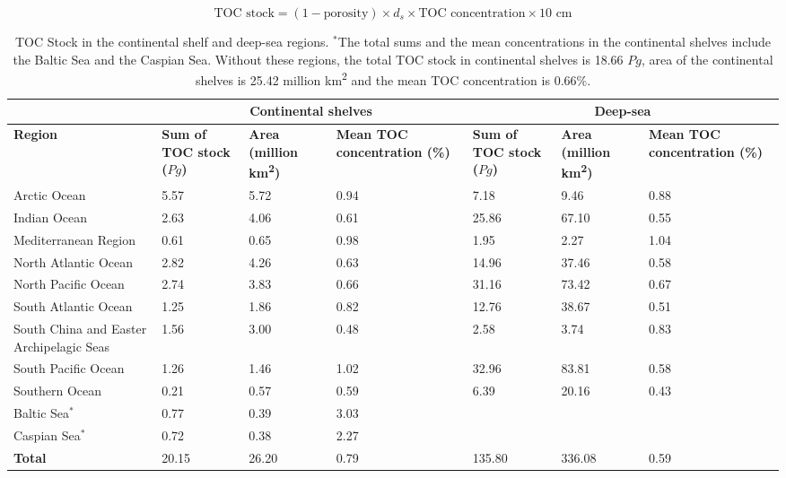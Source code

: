 \documentclass[journal abbreviation, manuscript]{copernicus}
\begin{document}
\begin{equation}
 \text{TOC stock} = (1 - \text{porosity}) \times d_s \times \text{TOC concentration} \times \text{10 cm}   
 \label{eq:stock}
\end{equation}


\begin{table}[htbp]

\centering
\begin{tabular}{|p{}|p{}|p{}|p{}||p{}|p{}|p{}|}
\hline
& \multicolumn{3}{c||}{\textbf{Continental shelves}} & \multicolumn{3}{c|}{\textbf{Deep-sea}} \\
\hline
\textbf{Region} & \textbf{Sum of TOC stock ($Pg$)} & \textbf{Area (million km\textsuperscript{2})} & \textbf{Mean TOC concentration (\%)} & \textbf{Sum of TOC stock ($Pg$)} & \textbf{Area (million km\textsuperscript{2})} & \textbf{Mean TOC concentration (\%)} \\
\hline
\hline
Arctic Ocean & 5.57& 5.72 & 0.94& 7.18& 9.46 & 0.88\\
\hline
Indian Ocean & 2.63& 4.06 & 0.61& 25.86& 67.10 & 0.55\\
\hline
Mediterranean Region & 0.61& 0.65 & 0.98& 1.95& 2.27 & 1.04\\
\hline
North Atlantic Ocean & 2.82& 4.26 & 0.63& 14.96& 37.46 & 0.58\\
\hline
North Pacific Ocean & 2.74& 3.83 & 0.66& 31.16& 73.42 & 0.67\\
\hline
South Atlantic Ocean & 1.25& 1.86 & 0.82& 12.76& 38.67 & 0.51\\
\hline
South China and Easter Archipelagic Seas & 1.56& 3.00 & 0.48& 2.58& 3.74 & 0.83\\
\hline
South Pacific Ocean & 1.26& 1.46 & 1.02& 32.96& 83.81 & 0.58\\
\hline
Southern Ocean & 0.21& 0.57 & 0.59& 6.39& 20.16 & 0.43\\
\hline
Baltic Sea$^*$ & 0.77& 0.39 & 3.03& & & \\
\hline
Caspian Sea$^*$ & 0.72& 0.38 & 2.27& & & \\
\hline
\hline
\textbf{Total} & 20.15& 26.20 & 0.79& 135.80& 336.08 & 0.59\\
\hline
\end{tabular}
\caption{TOC Stock in the continental shelf  and deep-sea regions. $^*$The total sums and the mean concentrations in the continental shelves include the Baltic Sea and the Caspian Sea. Without these regions, the total TOC stock in continental shelves is 18.66 $Pg$, area of the continental shelves is 25.42 million km\textsuperscript{2} and the mean TOC concentration is 0.66\%. }
\label{tab:TOCStockOcean} 
\end{table}
\end{document}
